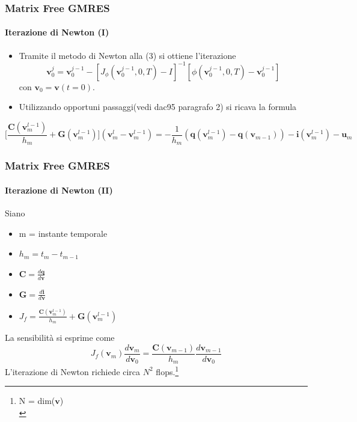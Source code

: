 \documentclass[10pt]{beamer}
\begin{document}
\begin{frame}
\frametitle{Matrix Free GMRES}
\framesubtitle{Iterazione di Newton (I)}
\begin{itemize}
\item Tramite il metodo di Newton alla (3) si ottiene l'iterazione\begin{equation}
\mathbf{v}_0^j = \mathbf{v}_0^{j-1} - [J_{\phi}(\mathbf{v}_0^{j-1},0,T) - I]^{-1}[\phi(\mathbf{v}_0^{j-1},0,T) - \mathbf{v}_0^{j-1}]
\end{equation}con $\mathbf{v}_0 = \mathbf{v}(t=0)$.       
\item Utilizzando opportuni passaggi(vedi dac95 paragrafo 2) si ricava la formula
\end{itemize} 
 \begin{equation}
\bigg[\frac{\mathbf{C}(\mathbf{v}_m^{l-1})}{h_m} + \mathbf{G}(\mathbf{v}_m^{l-1})\bigg](\mathbf{v}_m^l-\mathbf{v}_m^{l-1}) = - \frac{1}{h_m}(\mathbf{q}(\mathbf{v}_m^{l-1}) - \mathbf{q}(\mathbf{v}_{m-1})) - \mathbf{i}(\mathbf{v}_m^{l-1}) - \mathbf{u}_m
\tag{8}
\end{equation}
\end{frame}


\begin{frame}
\frametitle{Matrix Free GMRES}
\framesubtitle{Iterazione di Newton (II)}
Siano\\
\begin{itemize}
\item m = instante temporale%
\item $h_m = t_m - t_{m-1}$
\item $\mathbf{C} = \frac{d\mathbf{q}}{d\mathbf{v}}$
\item $\mathbf{G} = \frac{d\mathbf{i}}{d\mathbf{v}}$ 
\item $J_f = \frac{\mathbf{C}(\mathbf{v}_m^{l-1})}{h_m} + \mathbf{G}(\mathbf{v}_m^{l-1})$
\end{itemize}
 La sensibilità si esprime come
 \begin{equation}
J_f(\mathbf{v}_m)\frac{d\mathbf{v}_m}{d\mathbf{v}_0} = \frac{\mathbf{C}(\mathbf{v}_{m-1})}{h_m}\frac{d\mathbf{v}_{m-1}}{d\mathbf{v}_0}
\tag{11}
\end{equation}
L'iterazione di Newton richiede circa $N^2$ flops.\footnote{N = dim($\mathbf{v}$)\\}
\end{frame}
\end{document}
